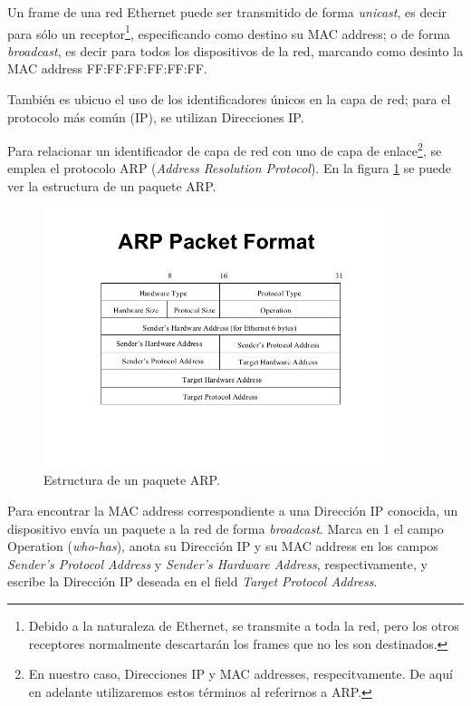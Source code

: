 \par Un frame de una red Ethernet puede ser transmitido de forma \textit{unicast}, es decir para sólo un receptor\footnote{Debido a la naturaleza de Ethernet, se transmite a toda la red, pero los otros receptores normalmente descartarán los frames que no les son destinados.}, especificando como destino su MAC address; o de forma \textit{broadcast}, es decir para todos los dispositivos de la red, marcando como desinto la MAC address FF:FF:FF:FF:FF:FF.

\par También es ubicuo el uso de los identificadores únicos en la capa de red; para el protocolo más común (IP), se utilizan Direcciones IP.

\par Para relacionar un identificador de capa de red con uno de capa de enlace\footnote{En nuestro caso, Direcciones IP y MAC addresses, respecitvamente. De aquí en adelante utilizaremos estos términos al referirnos a ARP.}, se emplea el protocolo ARP (\textit{Address Resolution Protocol}).
En la figura \ref{ARPpacket} se puede ver la estructura de un paquete ARP.

\begin{figure}[ht]
    \centering
    \includegraphics[width=0.9\textwidth]{figuras/ARPpacket}
    \caption{Estructura de un paquete ARP.}\label{ARPpacket}
\end{figure}

\par Para encontrar la MAC address correspondiente a una Dirección IP conocida, un dispositivo envía un paquete a la red de forma \textit{broadcast}.
Marca en 1 el campo Operation (\textit{who-has}), anota su Dirección IP y su MAC address en los campos \textit{Sender's Protocol Address} y \textit{Sender's Hardware Address}, respectivamente, y escribe la Dirección IP deseada en el field \textit{Target Protocol Address}.

